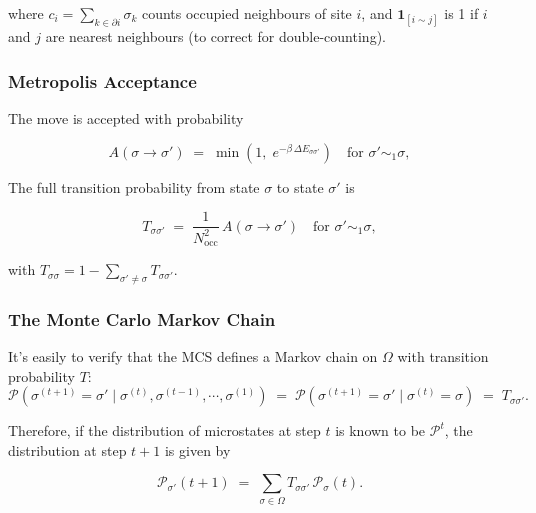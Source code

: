 \documentclass[12pt, a4paper]{article}
\theoremstyle{definition}
\newcommand{\betaT}{\beta}
\newcommand{\Nocc}{N_\mathrm{occ}}
\begin{document}
where $c_i = \sum_{k \in \partial i} \sigma_k$ counts occupied
neighbours of site $i$, and $\mathbf{1}_{[i \sim j]}$ is 1 if $i$
and $j$ are nearest neighbours (to correct for double-counting).



\subsubsection{Metropolis Acceptance}

\hfill

The move is accepted with probability

\begin{equation}
    A(\sigma \to \sigma') \;=\; \min\!\left(1,\;
    e^{-\betaT\,\Delta E_{\sigma \sigma'}}\right)
    \quad \text{for } \sigma' \sim_1 \sigma,
    \label{eq:metropolis}
\end{equation}

The full transition probability from state $\sigma$ to state $\sigma'$ is

\begin{equation}
    T_{\sigma \sigma'} \;=\;
    \frac{1}{\Nocc^2}\,A(\sigma \to \sigma')
    \quad \text{for } \sigma' \sim_1 \sigma,
    \label{eq:kernel}
\end{equation}

with $T_{\sigma \sigma} = 1 - \sum_{\sigma' \neq \sigma} T_{\sigma \sigma'}$.

\subsubsection{The Monte Carlo Markov Chain}
\hfill

It's easily to verify that the MCS defines a Markov chain on $\Omega$ with transition probability $T$:
\begin{equation}
    \mathcal{P}\!\left(\sigma^{(t+1)} = \sigma' \mid \sigma^{(t)},\sigma^{(t-1)},\cdots, \sigma^{(1)}\right)\;=\;
    \mathcal{P}\!\left(\sigma^{(t+1)} = \sigma' \mid \sigma^{(t)} = \sigma\right)
    \;=\; T_{\sigma \sigma'}.
    \label{eq:markov_chain}
\end{equation}

Therefore, if the distribution of microstates at step $t$ is known to be $\mathcal{P}^t$, the distribution at step $t+1$ is given by

\begin{equation}
    \mathcal{P}_{\sigma'}(t+1) \;=\; \sum_{\sigma \in \Omega} T_{\sigma \sigma'}\,\mathcal{P}_{\sigma}(t).
    \label{eq:distribution_evolution}
\end{equation}
\end{document}
